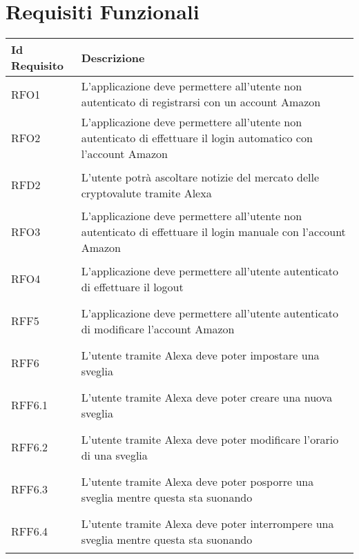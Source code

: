 \section{Requisiti Funzionali}
\normalsize
\begin{longtable}{|>{\centering}m{5em}|m{25em}|}
	\hline
	\textbf{Id Requisito} & \textbf{Descrizione}\\
	\hline
	\endhead
	
	\hypertarget{RFO1}{RFO1} & L'applicazione deve permettere all'utente non autenticato di registrarsi con un account Amazon \\ \hline
	
	\hypertarget{RFO2}{RFO2} & L'applicazione deve permettere all'utente non autenticato di effettuare il login automatico con l'account Amazon \\ \hline
	
	\hypertarget{RFD2}{RFD2} & L'utente potrà ascoltare notizie del mercato delle cryptovalute tramite Alexa\\ \hline
	
	\hypertarget{RFO3}{RFO3} & L'applicazione deve permettere all'utente non autenticato di effettuare il login manuale con l'account Amazon\\ \hline
	
	\hypertarget{RFO4}{RFO4} & L'applicazione deve permettere all'utente autenticato di effettuare il logout\\ \hline
	
	\hypertarget{RFF5}{RFF5} & L'applicazione deve permettere all'utente autenticato di modificare l'account Amazon\\ \hline
	
	\hypertarget{RFF6}{RFF6} & L'utente tramite Alexa deve poter impostare una sveglia\\ \hline
	
	\hypertarget{RFF6.1}{RFF6.1} & L'utente tramite Alexa deve poter creare una nuova sveglia\\ \hline
	
	\hypertarget{RFF6.2}{RFF6.2} & L'utente tramite Alexa deve poter modificare l'orario di una sveglia\\ \hline
	
	\hypertarget{RFF6.3}{RFF6.3} & L'utente tramite Alexa deve poter posporre una sveglia mentre questa sta suonando\\ \hline
	
	\hypertarget{RFF6.4}{RFF6.4} & L'utente tramite Alexa deve poter interrompere una sveglia mentre questa sta suonando\\ \hline
	

\end{longtable}
